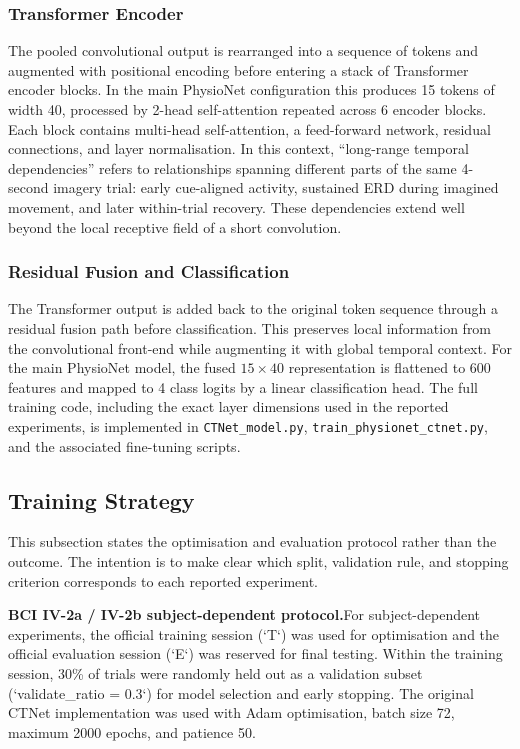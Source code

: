 \documentclass[12pt, a4paper]{article}
\begin{document}
\subsubsection{Transformer Encoder}

The pooled convolutional output is rearranged into a sequence of tokens and augmented with positional encoding before entering a stack of Transformer encoder blocks. In the main PhysioNet configuration this produces 15 tokens of width 40, processed by 2-head self-attention repeated across 6 encoder blocks. Each block contains multi-head self-attention, a feed-forward network, residual connections, and layer normalisation. In this context, ``long-range temporal dependencies'' refers to relationships spanning different parts of the same 4-second imagery trial: early cue-aligned activity, sustained ERD during imagined movement, and later within-trial recovery. These dependencies extend well beyond the local receptive field of a short convolution.

\subsubsection{Residual Fusion and Classification}

The Transformer output is added back to the original token sequence through a residual fusion path before classification. This preserves local information from the convolutional front-end while augmenting it with global temporal context. For the main PhysioNet model, the fused $15 \times 40$ representation is flattened to 600 features and mapped to 4 class logits by a linear classification head. The full training code, including the exact layer dimensions used in the reported experiments, is implemented in \texttt{CTNet\_model.py}, \texttt{train\_physionet\_ctnet.py}, and the associated fine-tuning scripts.

\subsection{Training Strategy}

This subsection states the optimisation and evaluation protocol rather than the outcome. The intention is to make clear which split, validation rule, and stopping criterion corresponds to each reported experiment.

\textbf{BCI IV-2a / IV-2b subject-dependent protocol.}\quad For subject-dependent experiments, the official training session (`T`) was used for optimisation and the official evaluation session (`E`) was reserved for final testing. Within the training session, 30\% of trials were randomly held out as a validation subset (`validate\_ratio = 0.3`) for model selection and early stopping. The original CTNet implementation was used with Adam optimisation, batch size 72, maximum 2000 epochs, and patience 50.
\end{document}
